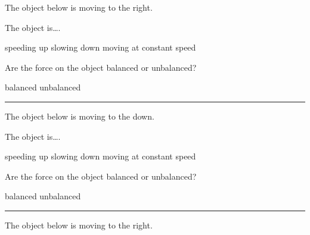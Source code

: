 \documentclass[../main-physics-problems.tex]{subfiles}
\begin{document}
\begin{questions}
\begin{multicols*}{2}
\vspace*{\fill}
\columnbreak


\question 
The object below is moving to the right.

\begin{center}
\end{center}

The object is\dots .

\begin{randomizechoices}[norandomize]
    \choice speeding up
    \correctchoice slowing down
    \choice moving at constant speed 
\end{randomizechoices}

\question 
Are the force on the object balanced or unbalanced?

\begin{randomizechoices}[norandomize]
    \choice balanced
    \correctchoice unbalanced
\end{randomizechoices}

\bigskip
\hrule

\question
The object below is moving to the down.

\begin{center}
\end{center}

The object is\dots .

\begin{randomizechoices}[norandomize]
    \correctchoice speeding up
    \choice slowing down
    \choice moving at constant speed 
\end{randomizechoices}

\question 
Are the force on the object balanced or unbalanced?

\begin{randomizechoices}[norandomize]
    \choice balanced
    \correctchoice unbalanced
\end{randomizechoices}

\bigskip
\hrule

\question 
The object below is moving to the right.


\end{multicols*}
\end{questions}
\end{document}
